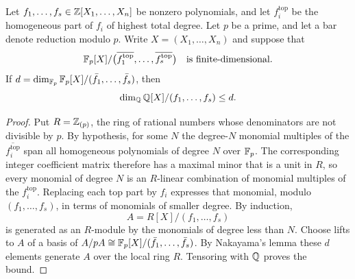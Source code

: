 \begin{lemma}\label{lem:transfer}
Let $f_1,\dots,f_s\in\mathbb{Z}[X_1,\dots,X_n]$ be nonzero polynomials, and let $f_i^{\mathrm{top}}$ be the homogeneous part of $f_i$ of highest total degree. Let $p$ be a prime, and let a bar denote reduction modulo $p$. Write $X=(X_1,\dots,X_n)$ and suppose that
\[
\mathbb{F}_p[X]/\bigl(\overline{f_1^{\mathrm{top}}},\dots,\overline{f_s^{\mathrm{top}}}\bigr)\quad\text{is finite-dimensional.}
\]
If $d=\dim_{\mathbb{F}_p}\mathbb{F}_p[X]/(\bar f_1,\dots,\bar f_s)$, then
\[
\dim_{\mathbb{Q}}\mathbb{Q}[X]/(f_1,\dots,f_s)\le d.
\]
\end{lemma}

\begin{proof}
Put $R=\mathbb{Z}_{(p)}$, the ring of rational numbers whose denominators are not divisible by $p$. By hypothesis, for some $N$ the degree-$N$ monomial multiples of the $\overline{f_i^{\mathrm{top}}}$ span all homogeneous polynomials of degree $N$ over $\mathbb{F}_p$. The corresponding integer coefficient matrix therefore has a maximal minor that is a unit in $R$, so every monomial of degree $N$ is an $R$-linear combination of monomial multiples of the $f_i^{\mathrm{top}}$. Replacing each top part by $f_i$ expresses that monomial, modulo $(f_1,\dots,f_s)$, in terms of monomials of smaller degree. By induction,
\[
A=R[X]/(f_1,\dots,f_s)
\]
is generated as an $R$-module by the monomials of degree less than $N$. Choose lifts to $A$ of a basis of $A/pA\cong\mathbb{F}_p[X]/(\bar f_1,\dots,\bar f_s)$. By Nakayama's lemma these $d$ elements generate $A$ over the local ring $R$. Tensoring with $\mathbb{Q}$ proves the bound.
\end{proof}
